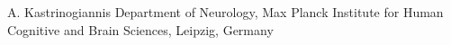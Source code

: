 
                {A. Kastrinogiannis}
                {Department of Neurology, Max Planck Institute for Human Cognitive and Brain Sciences, Leipzig, Germany}
                